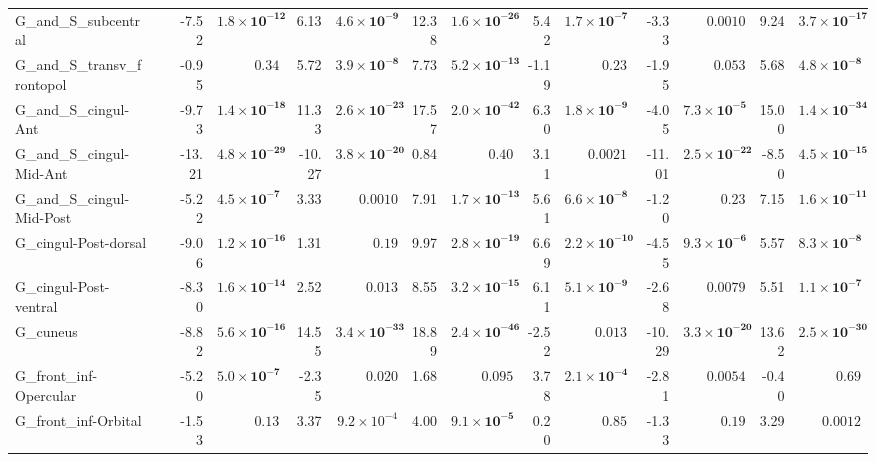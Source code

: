 {\begin{longtable}{llrrrrrrrrrrrr}
G\_and\_S\_subcentral &  & -7.52 & $\mathbf{1.8{\times}10^{-12}}$ & 6.13 & $\mathbf{4.6{\times}10^{-9}}$ & 12.38 & $\mathbf{1.6{\times}10^{-26}}$ & 5.42 & $\mathbf{1.7{\times}10^{-7}}$ & -3.33 & $0.0010$ & 9.24 & $\mathbf{3.7{\times}10^{-17}}$ \\
G\_and\_S\_transv\_frontopol &  & -0.95 & $0.34$ & 5.72 & $\mathbf{3.9{\times}10^{-8}}$ & 7.73 & $\mathbf{5.2{\times}10^{-13}}$ & -1.19 & $0.23$ & -1.95 & $0.053$ & 5.68 & $\mathbf{4.8{\times}10^{-8}}$ \\
G\_and\_S\_cingul-Ant &  & -9.73 & $\mathbf{1.4{\times}10^{-18}}$ & 11.33 & $\mathbf{2.6{\times}10^{-23}}$ & 17.57 & $\mathbf{2.0{\times}10^{-42}}$ & 6.30 & $\mathbf{1.8{\times}10^{-9}}$ & -4.05 & $\mathbf{7.3{\times}10^{-5}}$ & 15.00 & $\mathbf{1.4{\times}10^{-34}}$ \\
G\_and\_S\_cingul-Mid-Ant &  & -13.21 & $\mathbf{4.8{\times}10^{-29}}$ & -10.27 & $\mathbf{3.8{\times}10^{-20}}$ & 0.84 & $0.40$ & 3.11 & $0.0021$ & -11.01 & $\mathbf{2.5{\times}10^{-22}}$ & -8.50 & $\mathbf{4.5{\times}10^{-15}}$ \\
G\_and\_S\_cingul-Mid-Post &  & -5.22 & $\mathbf{4.5{\times}10^{-7}}$ & 3.33 & $0.0010$ & 7.91 & $\mathbf{1.7{\times}10^{-13}}$ & 5.61 & $\mathbf{6.6{\times}10^{-8}}$ & -1.20 & $0.23$ & 7.15 & $\mathbf{1.6{\times}10^{-11}}$ \\
G\_cingul-Post-dorsal &  & -9.06 & $\mathbf{1.2{\times}10^{-16}}$ & 1.31 & $0.19$ & 9.97 & $\mathbf{2.8{\times}10^{-19}}$ & 6.69 & $\mathbf{2.2{\times}10^{-10}}$ & -4.55 & $\mathbf{9.3{\times}10^{-6}}$ & 5.57 & $\mathbf{8.3{\times}10^{-8}}$ \\
G\_cingul-Post-ventral &  & -8.30 & $\mathbf{1.6{\times}10^{-14}}$ & 2.52 & $0.013$ & 8.55 & $\mathbf{3.2{\times}10^{-15}}$ & 6.11 & $\mathbf{5.1{\times}10^{-9}}$ & -2.68 & $0.0079$ & 5.51 & $\mathbf{1.1{\times}10^{-7}}$ \\
G\_cuneus &  & -8.82 & $\mathbf{5.6{\times}10^{-16}}$ & 14.55 & $\mathbf{3.4{\times}10^{-33}}$ & 18.89 & $\mathbf{2.4{\times}10^{-46}}$ & -2.52 & $0.013$ & -10.29 & $\mathbf{3.3{\times}10^{-20}}$ & 13.62 & $\mathbf{2.5{\times}10^{-30}}$ \\
G\_front\_inf-Opercular &  & -5.20 & $\mathbf{5.0{\times}10^{-7}}$ & -2.35 & $0.020$ & 1.68 & $0.095$ & 3.78 & $\mathbf{2.1{\times}10^{-4}}$ & -2.81 & $0.0054$ & -0.40 & $0.69$ \\
G\_front\_inf-Orbital &  & -1.53 & $0.13$ & 3.37 & $9.2{\times}10^{-4}$ & 4.00 & $\mathbf{9.1{\times}10^{-5}}$ & 0.20 & $0.85$ & -1.33 & $0.19$ & 3.29 & $0.0012$ \\

\end{longtable}}
